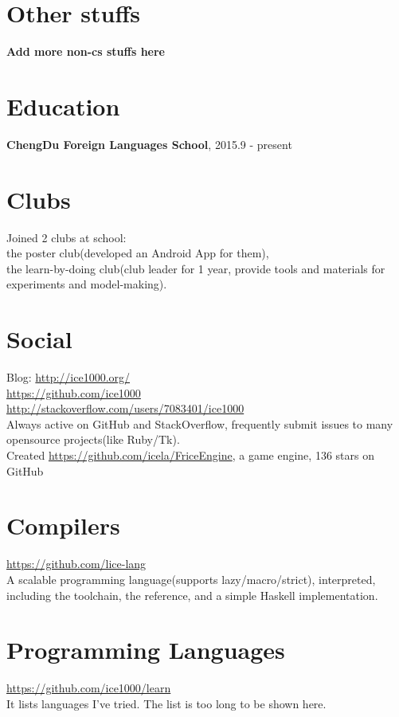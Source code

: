 \documentclass[margin, line]{res}
\begin{document}
\begin{resume}
  \section{\sc Other stuffs}
  \textbf{Add more non-cs stuffs here}

  \section{\sc Education}
  \textbf{ChengDu Foreign Languages School}, 2015.9 - present

  \section{\sc Clubs}
  Joined 2 clubs at school: \\
  the poster club(developed an Android App for them), \\
  the learn-by-doing club(club leader for 1 year, provide tools and materials for experiments
  and model-making).

  \section{\sc Social}
  Blog: \url{http://ice1000.org/} \\
  \url{https://github.com/ice1000} \\
  \url{http://stackoverflow.com/users/7083401/ice1000} \\
  Always active on GitHub and StackOverflow,
  frequently submit issues to many opensource projects(like Ruby/Tk). \\
  Created \url{https://github.com/icela/FriceEngine}, a game engine, 136 stars on GitHub

  \section{\sc Compilers}
  \url{https://github.com/lice-lang} \\
  A scalable programming language(supports lazy/macro/strict), interpreted,
  including the toolchain, the reference, and a simple Haskell implementation.

	\section{\sc Programming Languages}
	\url{https://github.com/ice1000/learn} \\
	It lists languages I've tried.
	The list is too long to be shown here.


\end{resume}
\end{document}
